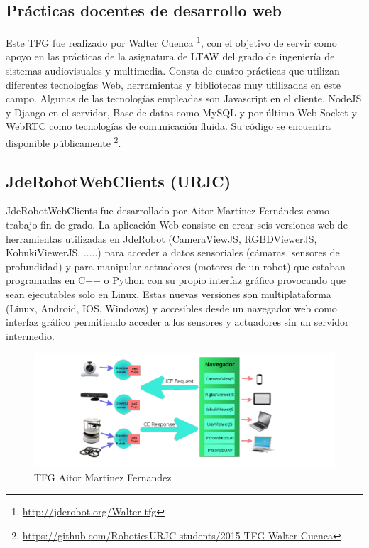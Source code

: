 \subsection*{Prácticas docentes de desarrollo web}
Este TFG\cite{TFGPracticasDesarrolloWeb}\cite{PracticasDesarrolloWeb} fue realizado por Walter Cuenca \footnote{\url{http://jderobot.org/Walter-tfg}}, con el objetivo de servir como apoyo en las prácticas de la asignatura de LTAW del grado de ingeniería de sistemas audiovisuales y multimedia. Consta de cuatro prácticas que utilizan diferentes tecnologías Web, herramientas y bibliotecas muy utilizadas en este campo. Algunas de las tecnologías empleadas son Javascript en el cliente, NodeJS y Django en el servidor, Base de datos como MySQL y por último Web-Socket y WebRTC como tecnologías de comunicación fluida.
Su código se encuentra disponible públicamente \footnote{\url{https://github.com/RoboticsURJC-students/2015-TFG-Walter-Cuenca}}.


\subsection*{JdeRobotWebClients (URJC)}
JdeRobotWebClients \cite{TFGJdeRobotWebClients}\cite{JdeRobotWebClients} fue desarrollado por Aitor Martínez Fernández como trabajo fin de grado. La aplicación Web consiste en crear seis versiones web de herramientas utilizadas en JdeRobot (CameraViewJS, RGBDViewerJS, KobukiViewerJS, .....) para acceder a datos sensoriales (cámaras, sensores de profundidad) y para manipular actuadores (motores de un robot) que estaban programadas en C++ o Python con su propio interfaz gráfico provocando que sean ejecutables solo en Linux.
Estas nuevas versiones son multiplataforma (Linux, Android, IOS, Windows) y accesibles desde un navegador web como interfaz gráfico permitiendo acceder a los sensores y actuadores sin un servidor intermedio.

\begin{figure}[!h]
    \centering
    \includegraphics[width=150mm]{img/introduccion/jdro.png}
    \caption{TFG Aitor Martinez Fernandez}
\end{figure}
